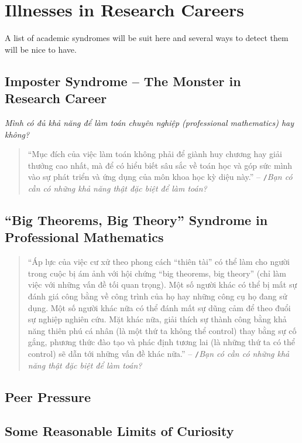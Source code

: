\documentclass{article}
\numberwithin{equation}{section}
\begin{document}
\section{Illnesses in Research Careers}
A list of academic syndromes will be suit here and several ways to detect them will be nice to have.

\subsection{Imposter Syndrome -- The Monster in Research Career}
\textit{Mình có đủ khả năng để làm toán chuyên nghiệp (professional mathematics) hay không?}
\begin{quotation}
	``Mục đích của việc làm toán không phải để giành huy chương hay giải thưởng cao nhất, mà để có hiểu biết sâu sắc về toán học và góp sức mình vào sự phát triển và ứng dụng của môn khoa học kỳ diệu này.'' -- \cite{VHV's blog}\texttt{/}\textit{Bạn có cần có những khả năng thật đặc biệt để làm toán?}
\end{quotation}

\subsection{``Big Theorems, Big Theory'' Syndrome in Professional Mathematics}
\begin{quotation}
	``Áp lực của việc cư xử theo phong cách ``thiên tài'' có thể làm cho người trong cuộc bị ám ảnh với hội chứng ``big theorems, big theory'' (chỉ làm việc với những vấn đề tối quan trọng). Một số người khác có thể bị mất sự đánh giá công bằng về công trình của họ hay những công cụ họ đang sử dụng. Một số người khác nữa có thể đánh mất sự dũng cảm để theo đuổi sự nghiệp nghiên cứu. Mặt khác nữa, giải thích sự thành công bằng khả năng thiên phú cá nhân (là một thứ ta không thể control) thay bằng sự cố gắng, phương thức đào tạo và phác định tương lai (là những thứ ta có thể control) sẽ dẫn tới những vấn đề khác nữa.'' -- \cite{VHV's blog}\texttt{/}\textit{Bạn có cần có những khả năng thật đặc biệt để làm toán?}
\end{quotation}
\subsection{Peer Pressure}

\subsection{Some Reasonable Limits of Curiosity}
\end{document}
